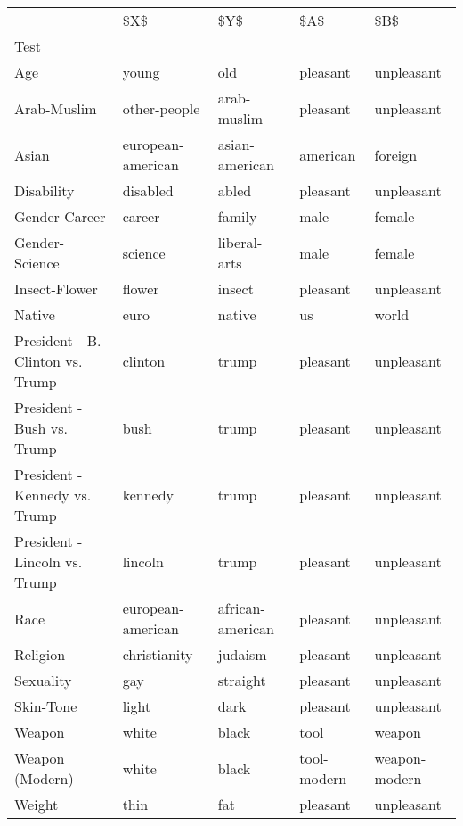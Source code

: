 \begin{tabular}{lllll}
\toprule
{} &                \$X\$ &               \$Y\$ &          \$A\$ &            \$B\$ \\
Test                             &                    &                   &              &                \\
\midrule
Age                              &              young &               old &     pleasant &     unpleasant \\
Arab-Muslim                      &       other-people &       arab-muslim &     pleasant &     unpleasant \\
Asian                            &  european-american &    asian-american &     american &        foreign \\
Disability                       &           disabled &             abled &     pleasant &     unpleasant \\
Gender-Career                    &             career &            family &         male &         female \\
Gender-Science                   &            science &      liberal-arts &         male &         female \\
Insect-Flower                    &             flower &            insect &     pleasant &     unpleasant \\
Native                           &               euro &            native &           us &          world \\
President - B. Clinton vs. Trump &            clinton &             trump &     pleasant &     unpleasant \\
President - Bush vs. Trump       &               bush &             trump &     pleasant &     unpleasant \\
President - Kennedy vs. Trump    &            kennedy &             trump &     pleasant &     unpleasant \\
President - Lincoln vs. Trump    &            lincoln &             trump &     pleasant &     unpleasant \\
Race                             &  european-american &  african-american &     pleasant &     unpleasant \\
Religion                         &       christianity &           judaism &     pleasant &     unpleasant \\
Sexuality                        &                gay &          straight &     pleasant &     unpleasant \\
Skin-Tone                        &              light &              dark &     pleasant &     unpleasant \\
Weapon                           &              white &             black &         tool &         weapon \\
Weapon (Modern)                  &              white &             black &  tool-modern &  weapon-modern \\
Weight                           &               thin &               fat &     pleasant &     unpleasant \\
\bottomrule
\end{tabular}
